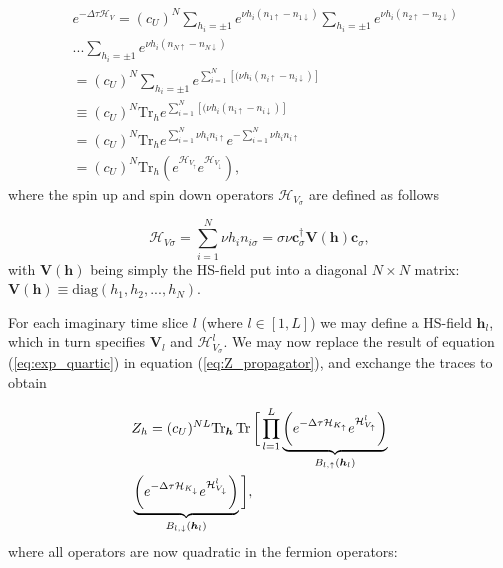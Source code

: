 \begin{equation}\label{eq:exp_quartic}
\begin{split}
&e^{-\Delta\tau \mathcal{H}_V} =  (c_U)^N \sum_{h_i = \pm 1} e^{\nu h_i ( n_{1\uparrow} - n_{1\downarrow} )} \sum_{h_i = \pm 1} e^{\nu h_i ( n_{2\uparrow} - n_{2\downarrow} )}  \\
&... \sum_{h_i = \pm 1} e^{\nu h_i ( n_{N\uparrow} - n_{N\downarrow} )} \\
&= (c_U)^N \sum_{h_i = \pm 1} e^{\sum_{i=1}^N [(\nu h_i ( n_{i\uparrow} - n_{i\downarrow} ) ]} \\
&\equiv (c_U)^N \text{Tr}_h e^{\sum_{i=1}^N [(\nu h_i ( n_{i\uparrow} - n_{i\downarrow} ) ]} \\
&= (c_U)^N \text{Tr}_h e^{\sum_{i=1}^N \nu h_i n_{i\uparrow}} e^{-\sum_{i=1}^N \nu h_i n_{i\uparrow}} \\
&= (c_U)^N \text{Tr}_h ( e^{\mathcal{H}_{V_\uparrow}} e^{\mathcal{H}_{V_\downarrow}} ) ,
\end{split}
\end{equation}
where the spin up and spin down operators $\mathcal{H}_{V_\sigma}$ are defined as follows

\begin{equation}
\mathcal{H}_{V\sigma} = \sum_{i=1}^N \nu h_i n_{i\sigma} = \sigma \nu \bm c_\sigma^\dagger \bm V(\bm h) \bm c_\sigma,
\end{equation}
with $\bm V(\bm h)$ being simply the HS-field put into a diagonal $N\times N$ matrix: $\bm V(\bm h) \equiv \text{diag}(h_1, h_2, ..., h_N)$.

For each imaginary time slice $l$ (where $l \in [1, L]$) we may define a HS-field $\bm h_l$, which in turn specifies $\bm V_l$ and $\mathcal{H}_{V_\sigma}^l$. We may now replace the result of equation (\ref{eq:exp_quartic}) in equation (\ref{eq:Z_propagator}), and exchange the traces to obtain

\begin{equation}\label{eq:Z_quadratic}
\begin{split}
&Z_h = (c_U)^{NL} \text{Tr}_{\bm h} \operatorname{Tr} \bigg[ \prod_{l=1}^L \underbrace{\bigg( e^{-\Delta\tau  \mathcal{H}_{K_\uparrow}} e^{\mathcal{H}_{V_\uparrow}^l} \bigg)}_{B_{l, \uparrow}(\bm h_l)} \\
&\underbrace{\bigg( e^{-\Delta\tau  \mathcal{H}_{K_\downarrow}} e^{\mathcal{H}_{V_\downarrow}^l} \bigg)}_{B_{l, \downarrow}(\bm h_l)} \bigg],
\end{split}
\end{equation}
where all operators are now quadratic in the fermion operators:

